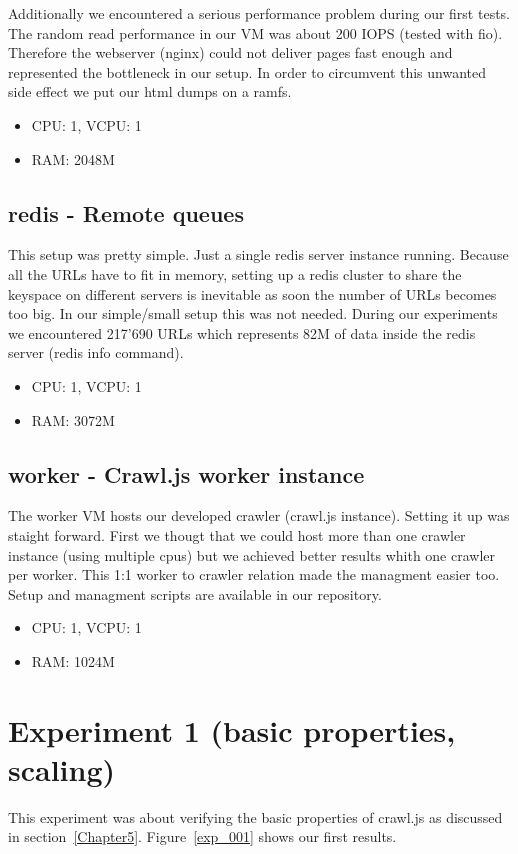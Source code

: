 Additionally we encountered a serious performance problem during our first tests. The random read performance in our VM was about 200 IOPS (tested with fio). Therefore the webserver (nginx) could not deliver pages fast enough and represented the bottleneck in our setup. In order to circumvent this unwanted side effect we put our html dumps on a ramfs.

\begin{itemize}
  \item CPU: 1, VCPU: 1
  \item RAM: 2048M
\end{itemize}

\subsection{redis - Remote queues}
This setup was pretty simple. Just a single redis server instance running. Because all the URLs have to fit in memory, setting up a redis cluster to share the keyspace on different servers is inevitable as soon the number of URLs becomes too big. In our simple/small setup this was not needed. During our experiments we encountered 217'690 URLs which represents 82M of data inside the redis server (redis info command).

\begin{itemize}
  \item CPU: 1, VCPU: 1
  \item RAM: 3072M
\end{itemize}

\subsection{worker - Crawl.js worker instance}
The worker VM hosts our developed crawler (crawl.js instance). Setting it up was staight forward. First we thougt that we could host more than one crawler instance (using multiple cpus) but we achieved better results whith one crawler per worker. This 1:1 worker to crawler relation made the managment easier too. Setup and managment scripts are available in our repository.

\begin{itemize}
  \item CPU: 1, VCPU: 1
  \item RAM: 1024M
\end{itemize}

\section{Experiment 1 (basic properties, scaling)}
This experiment was about verifying the basic properties of crawl.js as discussed in section~\ref{Chapter5}. Figure~\ref{exp_001} shows our first results.

